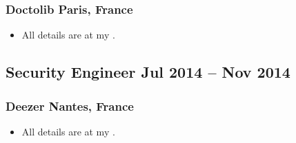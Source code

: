 \subsubsection{Doctolib  \texorpdfstring{\hspace*{\fill}}{\hspace*{\fill}} \normalfont Paris, France}

\begin{itemize}
    \item All details are at my .
\end{itemize}	

\subsection{Security Engineer \texorpdfstring{\hspace*{\fill}}{\hspace*{\fill}} \normalfont Jul 2014 -- Nov 2014}
\subsubsection{Deezer  \texorpdfstring{\hspace*{\fill}}{\hspace*{\fill}} \normalfont Nantes, France}

\begin{itemize}
    \item All details are at my .
\end{itemize}
